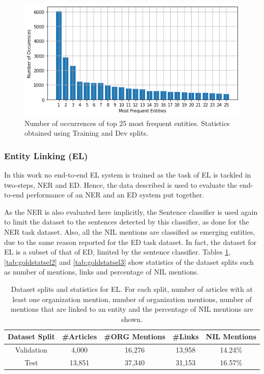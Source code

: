 \documentclass{report}
\theoremstyle{definition}
\theoremstyle{remark}
\begin{document}
\begin{figure}
    \centering
    \includegraphics[scale=0.6]{ent_occ.png}
    \caption{Number of occurrences of top 25 most frequent entities. Statistics obtained using Training and Dev splits.}
    \label{fig:entpopul}
\end{figure}


\subsubsection{Entity Linking (EL)}
In this work no end-to-end EL system is trained as the task of EL is tackled in two-steps, NER and ED. Hence, the data described is used to evaluate the end-to-end performance of an NER and an ED system put together. 

As the NER is also evaluated here implicitly, the Sentence classifier is used again to limit the dataset to the sentences detected by this classifier, as done for the NER task dataset. Also, all the NIL mentions are classified as emerging entities, due to the same reason reported for the ED task dataset. In fact, the dataset for EL is a subset of that of ED, limited by the sentence classifier. Tables \ref{tab:goldstatsel}, \ref{tab:goldstatsel2} and \ref{tab:goldstatsel3} show statistics of the dataset splits such as number of mentions, links and percentage of NIL mentions.

\begin{table}[H]
    \centering
    \begin{tabular}{ccccc}
     Dataset Split & \#Articles & \#ORG Mentions & \#Links & NIL Mentions  \\
     \hline
    Validation & 4,000  & 16,276 & 13,958 & 14.24\% \\
    Test           & 13,851 & 37,340 & 31,153 & 16.57\% \\
    \end{tabular}
    \caption{Dataset splits and statistics for EL. For each split, number of articles with at least one organization mention, number of organization mentions, number of mentions that are linked to an entity and the percentage of NIL mentions are shown.}
    \label{tab:goldstatsel}
\end{table}
\end{document}
